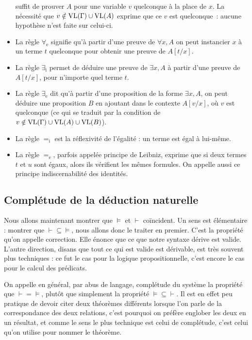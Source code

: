 \begin{itemize}
  suffit de prouver $A$ pour une variable $v$ quelconque à la place de $x$. La
  nécessité que $v\notin\operatorname{VL}(\Gamma)\cup\operatorname{VL}(A)$ exprime que ce $v$ est
  quelconque~: aucune hypothèse n'est faite sur celui-ci.
\item La règle $\forall_\mathrm e$ signifie qu'à partir d'une preuve de
  $\forall x, A$ on peut instancier $x$ à un terme $t$ quelconque pour obtenir
  une preuve de $A[t/x]$.
\item La règle $\exists_\mathrm i$ permet de déduire une preuve de $\exists x,A$
  à partir d'une preuve de $A[t/x]$, pour n'importe quel terme $t$.
\item La règle $\exists_\mathrm e$ dit qu'à partir d'une proposition de la forme
  $\exists x, A$, on peut déduire une proposition $B$ en ajoutant dans le
  contexte $A[v/x]$, où $v$ est quelconque (ce qui se traduit par la condition
  de $v\notin\operatorname{VL}(\Gamma)\cup\operatorname{VL}(A)\cup\operatorname{VL}(B)$).
\item La règle $=_\mathrm i$ est la réflexivité de l'égalité : un terme est
  égal à lui-même.
\item La règle $=_\mathrm e$, parfois appelée principe de Leibniz, exprime que
  si deux termes $t$ et $u$ sont égaux, alors ils vérifient les mêmes formules.
  On appelle aussi ce principe \og indiscernabilité des identités\fg{}.
\end{itemize}

\subsection[Théorème de complétude]{Complétude de la déduction naturelle}

Nous allons maintenant montrer que $\vDash$ et $\vdash$ coïncident. Un sens est
élémentaire : montrer que $\vdash \subseteq\vDash$, nous allons donc le traiter
en premier. C'est la propriété qu'on appelle correction. Elle énonce que ce que
notre syntaxe dérive est valide. L'autre direction, disans que tout ce qui est
valide est dérivable, est très souvent plus techniques : ce fut le cas pour
la logique propositionnelle, c'est encore le cas pour le calcul des prédicats.

On appelle en général, par abus de langage, complétude du système la propriété
que $\vdash = \vDash$, plutôt que simplement la propriété
$\vDash\subseteq\vdash$. Il est en effet peu pratique de devoir citer deux
théorèmes différents lorsque l'on parle de la correspondance des deux relations,
c'est pourquoi on préfère englober les deux en un résultat, et comme le sens le
plus technique est celui de complétude, c'est celui qu'on utilise pour nommer le
théorème.

